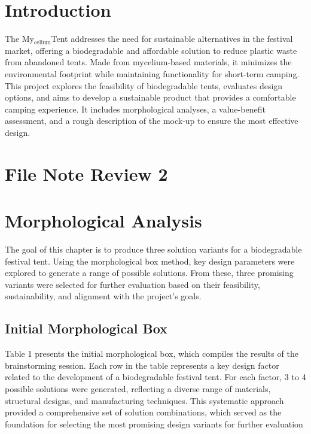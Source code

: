 \documentclass{article}
\begin{document}
\tableofcontents
\thispagestyle{empty}

\vspace*{1cm}
\section{Introduction}
The My$_{\text{celium}}$Tent addresses the need for sustainable alternatives in the
festival market, offering a biodegradable and affordable solution to reduce plastic waste
from abandoned tents. Made from mycelium-based materials, it minimizes the environmental
footprint while maintaining functionality for short-term camping. This project explores
the feasibility of biodegradable tents, evaluates design options, and aims to develop a
sustainable product that provides a comfortable camping experience. It includes
morphological analyses, a value-benefit assessment, and a rough description of the mock-up
to ensure the most effective design.

\newpage
\vspace*{-1.7cm}\section{File Note Review 2}
\begin{figure}[ht!]
    
\end{figure}
\newpage
\begin{figure}[ht!]
    
\end{figure}
\newpage

\section{Morphological Analysis}
The goal of this chapter is to produce three solution variants for a biodegradable festival
tent. Using the morphological box method, key design parameters were explored to
generate a range of possible solutions. From these, three promising variants were selected
for further evaluation based on their feasibility, sustainability, and alignment with the
project’s goals.

\subsection{Initial Morphological Box}
Table 1 presents the initial morphological box, which compiles the results of the
brainstorming session. Each row in the table represents a key design factor related to the
development of a biodegradable festival tent. For each factor, 3 to 4 possible solutions were
generated, reflecting a diverse range of materials, structural designs, and manufacturing
techniques. This systematic approach provided a comprehensive set of solution
combinations, which served as the foundation for selecting the most promising design
variants for further evaluation
\end{document}
